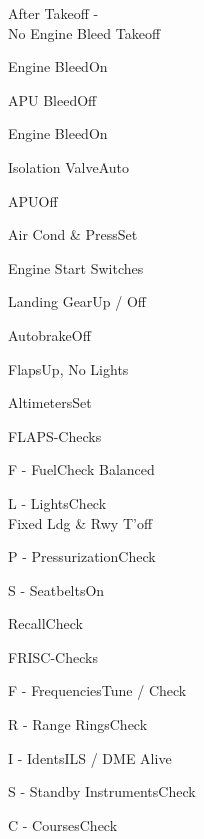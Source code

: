 \documentclass[sim-use]{checklist}
\begin{document}
\begin{checklist}{After Takeoff -\\No Engine Bleed Takeoff}
  \item{Engine  Bleed}{On}
  \item{APU Bleed}{Off}
  \item{Engine  Bleed}{On}
  \item{Isolation Valve}{Auto}
  \item{APU}{Off}
  \item{Air Cond \& Press}{Set}
  \item{Engine Start Switches}{\blank}
  \item{Landing Gear}{Up / Off}
  \item{Autobrake}{Off}
  \item{Flaps}{Up, No Lights}
  \item{Altimeters}{Set}
\end{checklist}

\clearpage

\begin{checklist}{FLAPS-Checks}
  \item{F - Fuel}{Check Balanced}
  \item{L - Lights}{Check\\Fixed Ldg \& Rwy T'off}
  \item{P - Pressurization}{Check}
  \item{S - Seatbelts}{On}
  \item{Recall}{Check}
\end{checklist}

\begin{checklist}{FRISC-Checks}
  \item{F - Frequencies}{Tune / Check}
  \item{R - Range Rings}{Check}
  \item{I - Idents}{ILS / DME Alive}
  \item{S - Standby Instruments}{Check}
  \item{C - Courses}{Check}
\end{checklist}
\end{document}
